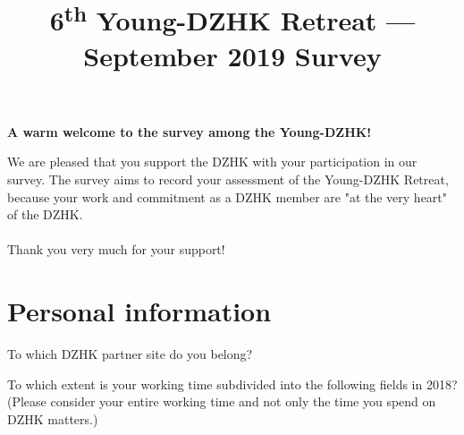 \documentclass[
  english,
  globalid=09-2019-v4-Young-DZHK,
  pagemark,
  stamp]{sdaps}
\title{6\textsuperscript{th} Young-DZHK Retreat --- September 2019 Survey}
\begin{document}

  \begin{questionnaire}
    \begin{info}
\textbf{A warm welcome to the survey among the Young-DZHK!}

We are pleased that you support the DZHK with your participation in our survey.
The survey aims to record your assessment of the Young-DZHK Retreat, because your work
and commitment as a DZHK member are "at the very heart" of the DZHK.
\\
\\
Thank you very much for your support!

   \end{info}


    \section{Personal information}

    
        \begin{choicequestion}[2]{To which DZHK partner site do you belong?}
      
    \end{choicequestion}
 
    \begin{markgroup}{To which extent is your working time subdivided into the 
following fields in 2018? (Please consider your entire
working time and not only the time you spend on DZHK matters.)}


\end{markgroup}
\end{questionnaire}
\end{document}
